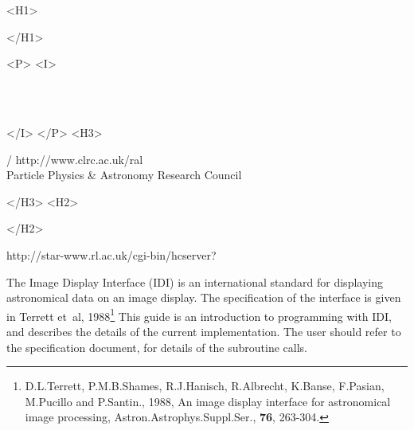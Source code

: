 \begin{htmlonly}
   \xlabel{}
   \begin{rawhtml} <H1> \end{rawhtml}
      \stardoctitle
   \begin{rawhtml} </H1> \end{rawhtml}


   \begin{rawhtml} <P> <I> \end{rawhtml}
   \stardoccategory \stardocnumber \\
   \stardocauthors \\
   \stardocdate
   \begin{rawhtml} </I> </P> <H3> \end{rawhtml}
       /
                        {http://www.clrc.ac.uk/ral} \\
      Particle Physics \& Astronomy Research Council \\
   \begin{rawhtml} </H3> <H2> \end{rawhtml}
   \begin{rawhtml} </H2> \end{rawhtml}
      {http://star-www.rl.ac.uk/cgi-bin/hcserver?\stardocsource}\\


\end{htmlonly}


The Image Display Interface (IDI) is an international standard for
displaying astronomical data on an image display. 
The specification of the interface is given in Terrett et~al, 
1988\footnote{D.L.Terrett, P.M.B.Shames, R.J.Hanisch, R.Albrecht,
K.Banse, F.Pasian, M.Pucillo and P.Santin., 1988, 
An image display interface for astronomical image processing, 
Astron.Astrophys.Suppl.Ser., {\bf 76}, 263-304.}
This guide is an introduction to
programming with IDI, and describes the details of the current implementation.
The user should refer to the specification document, for details of the
subroutine calls.

